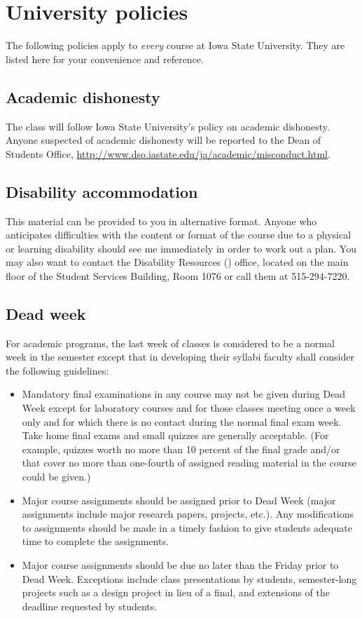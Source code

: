 \newpage

\section{University policies}

The following policies apply to \emph{every} course at Iowa State
University. They are listed here for your convenience and reference.

\subsection{Academic dishonesty}

The class will follow Iowa State University's policy on academic
dishonesty.  Anyone suspected of academic dishonesty will be reported
to the Dean of Students Office,
\url{http://www.dso.iastate.edu/ja/academic/misconduct.html}.

\subsection{Disability accommodation}

This material can be provided to you in alternative format. Anyone who
anticipates difficulties with the content or format of the course due
to a physical or learning disability should see me immediately in
order to work out a plan. You may also want to contact the Disability
Resources () office, located on the main floor of the
Student Services Building, Room 1076 or call them at 515-294-7220.

\subsection{Dead week}

For academic programs, the last week of classes is considered to be a
normal week in the semester except that in developing their syllabi
faculty shall consider the following guidelines:

\begin{itemize}
\item Mandatory final examinations in any course may not be given
  during Dead Week except for laboratory courses and for those classes
  meeting once a week only and for which there is no contact during
  the normal final exam week. Take home final exams and small quizzes
  are generally acceptable. (For example, quizzes worth no more than
  10 percent of the final grade and/or that cover no more than
  one-fourth of assigned reading material in the course could be
  given.)
\item Major course assignments should be assigned prior to Dead Week
  (major assignments include major research papers, projects,
  etc.). Any modifications to assignments should be made in a timely
  fashion to give students adequate time to complete the assignments.
\item Major course assignments should be due no later than the Friday
  prior to Dead Week. Exceptions include class presentations by
  students, semester-long projects such as a design project in lieu of
  a final, and extensions of the deadline requested by students.
\end{itemize}

